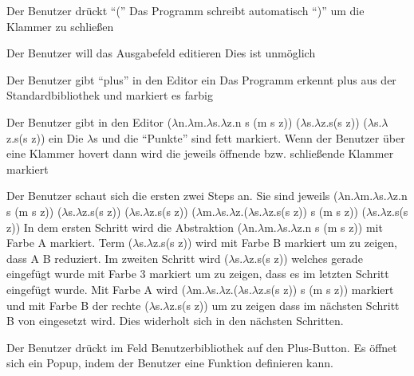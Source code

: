 \documentclass[parskip=full,11pt,twoside]{scrartcl}
\begin{document}
{Der Benutzer drückt \enquote{(}}
{Das Programm schreibt automatisch \enquote{)} um die Klammer zu schließen}

{Der Benutzer will das Ausgabefeld editieren}
{Dies ist unmöglich}




{Der Benutzer gibt \enquote{plus} in den Editor ein}
{Das Programm erkennt plus aus der Standardbibliothek und markiert es farbig}

{Der Benutzer gibt in den Editor \newline ($\lambda$n.$\lambda$m.$\lambda$s.$\lambda$z.n s (m s z)) ($\lambda$s.$\lambda$z.s(s z)) ($\lambda$s.$\lambda$z.s(s z)) ein }
{Die $\lambda$s und die \enquote{Punkte} sind fett markiert. Wenn der Benutzer über eine Klammer hovert dann wird die jeweils öffnende bzw. schließende Klammer markiert  }

{Der Benutzer schaut sich die ersten zwei Steps an. Sie sind jeweils
 \newline ($\lambda$n.$\lambda$m.$\lambda$s.$\lambda$z.n s (m s z)) ($\lambda$s.$\lambda$z.s(s z)) ($\lambda$s.$\lambda$z.s(s z))
 \newline ($\lambda$m.$\lambda$s.$\lambda$z.($\lambda$s.$\lambda$z.s(s z)) s (m s z)) ($\lambda$s.$\lambda$z.s(s z))
}
{In dem ersten Schritt wird die Abstraktion ($\lambda$n.$\lambda$m.$\lambda$s.$\lambda$z.n s (m s z)) mit Farbe A markiert. Term  ($\lambda$s.$\lambda$z.s(s z)) wird mit Farbe B markiert um zu zeigen, dass A B reduziert. Im zweiten Schritt wird  ($\lambda$s.$\lambda$z.s(s z)) welches gerade eingefügt wurde mit Farbe 3 markiert um zu zeigen, dass es im letzten Schritt eingefügt wurde. Mit Farbe A wird ($\lambda$m.$\lambda$s.$\lambda$z.($\lambda$s.$\lambda$z.s(s z)) s (m s z)) markiert und mit Farbe B der rechte ($\lambda$s.$\lambda$z.s(s z)) um zu zeigen dass im nächsten Schritt B von eingesetzt wird. Dies widerholt sich in den nächsten Schritten. }


{Der Benutzer drückt im Feld Benutzerbibliothek auf den Plus-Button.}
{Es öffnet sich ein Popup, indem der Benutzer eine Funktion definieren kann.}
\end{document}
